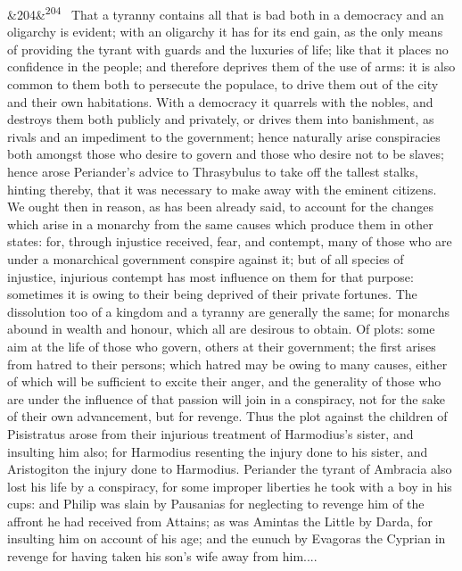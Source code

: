 \documentclass[12pt]{article}
\newcommand{\para}[1][]{\par\noindent\ifx&#1&\else\textsuperscript{\footnotesize #1}~\fi}
\begin{document}
\para[204] That a tyranny contains all that is bad both in a democracy and an oligarchy is evident; with an oligarchy it has for its end gain, as the only means of providing the tyrant with guards and the luxuries of life; like that it places no confidence in the people; and therefore deprives them of the use of arms: it is also common to them both to persecute the populace, to drive them out of the city and their own habitations. With a democracy it quarrels with the nobles, and destroys them both publicly and privately, or drives them into banishment, as rivals and an impediment to the government; hence naturally arise conspiracies both amongst those who desire to govern and those who desire not to be slaves; hence arose Periander's advice to Thrasybulus to take off the tallest stalks, hinting thereby, that it was necessary to make away with the eminent citizens. We ought then in reason, as has been already said, to account for the changes which arise in a monarchy from the same causes which produce them in other states: for, through injustice received, fear, and contempt, many of those who are under a monarchical government conspire against it; but of all species of injustice, injurious contempt has most influence on them for that purpose: sometimes it is owing to their being deprived of their private fortunes. The dissolution too of a kingdom and a tyranny are generally the same; for monarchs abound in wealth and honour, which all are desirous to obtain. Of plots: some aim at the life of those who govern, others at their government; the first arises from hatred to their persons; which hatred may be owing to many causes, either of which will be sufficient to excite their anger, and the generality of those who are under the influence of that passion will join in a conspiracy, not for the sake of their own advancement, but for revenge. Thus the plot against the children of Pisistratus arose from their injurious treatment of Harmodius's sister, and insulting him also; for Harmodius resenting the injury done to his sister, and Aristogiton the injury done to Harmodius. Periander the tyrant of Ambracia also lost his life by a conspiracy, for some improper liberties he took with a boy in his cups: and Philip was slain by Pausanias for neglecting to revenge him of the affront he had received from Attains; as was Amintas the Little by Darda, for insulting him on account of his age; and the eunuch by Evagoras the Cyprian in revenge for having taken his son's wife away from him....
\end{document}
